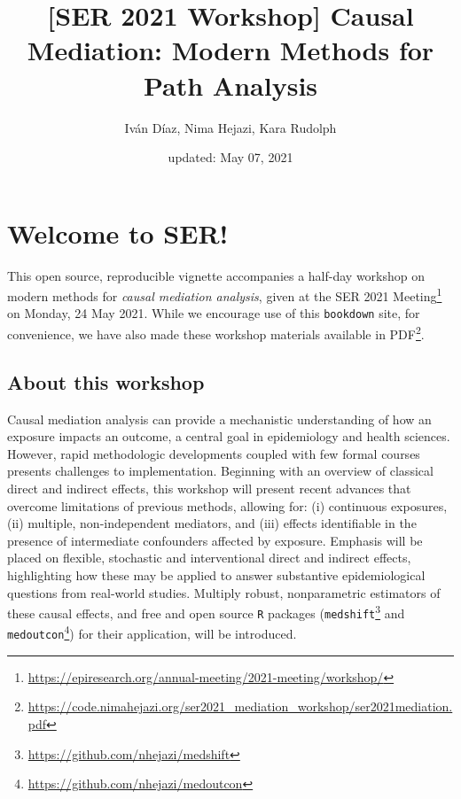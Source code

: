 \documentclass[
  12pt,
]{book}
\title{{[}SER 2021 Workshop{]} Causal Mediation: Modern Methods for Path Analysis}
\author{Iván Díaz, Nima Hejazi, Kara Rudolph}
\date{updated: May 07, 2021}
\newcommand{\passthrough}[1]{#1}
\renewcommand{\href}[2]{#2\footnote{\url{#1}}}
\theoremstyle{definition}
\theoremstyle{definition}
\theoremstyle{definition}
\newcommand{\1}{\mathbbm{1}}
\begin{document}
\maketitle


\thispagestyle{empty}

\begin{center}
\end{center}

\setlength{\abovedisplayskip}{-5pt}
\setlength{\abovedisplayshortskip}{-5pt}

\mainmatter

{
\hypersetup{linkcolor=}
\setcounter{tocdepth}{2}
\tableofcontents
}
\hypertarget{welcome-to-ser}{%
\chapter*{Welcome to SER!}\label{welcome-to-ser}}


This open source, reproducible vignette accompanies a half-day workshop on
modern methods for \emph{causal mediation analysis}, given at the \href{https://epiresearch.org/annual-meeting/2021-meeting/workshop/}{SER 2021
Meeting} on
Monday, 24 May 2021. While we encourage use of this \passthrough{\lstinline!bookdown!} site, for
convenience, we have also made these workshop materials \href{https://code.nimahejazi.org/ser2021_mediation_workshop/ser2021mediation.pdf}{available in
PDF}.

\hypertarget{about}{%
\section{About this workshop}\label{about}}

Causal mediation analysis can provide a mechanistic understanding of how an
exposure impacts an outcome, a central goal in epidemiology and health sciences.
However, rapid methodologic developments coupled with few formal courses
presents challenges to implementation. Beginning with an overview of classical
direct and indirect effects, this workshop will present recent advances that
overcome limitations of previous methods, allowing for: (i) continuous
exposures, (ii) multiple, non-independent mediators, and (iii) effects
identifiable in the presence of intermediate confounders affected by exposure.
Emphasis will be placed on flexible, stochastic and interventional direct and
indirect effects, highlighting how these may be applied to answer substantive
epidemiological questions from real-world studies. Multiply robust,
nonparametric estimators of these causal effects, and free and open source \passthrough{\lstinline!R!}
packages (\href{https://github.com/nhejazi/medshift}{\passthrough{\lstinline!medshift!}} and
\href{https://github.com/nhejazi/medoutcon}{\passthrough{\lstinline!medoutcon!}}) for their application, will
be introduced.
\end{document}
